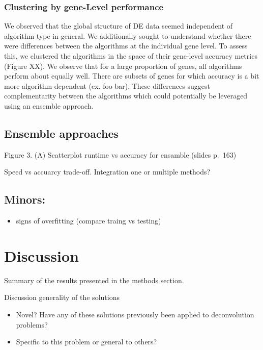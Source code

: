 \documentclass[]{article}
\providecommand{\tightlist}{%
  \setlength{\itemsep}{0pt}\setlength{\parskip}{0pt}}
\begin{document}
\hypertarget{clustering-by-gene-level-performance}{%
\subsubsection{Clustering by gene-Level
performance}\label{clustering-by-gene-level-performance}}

We observed that the global structure of DE data seemed independent of
algorithm type in general. We additionally sought to understand whether
there were differences between the algorithms at the individual gene
level. To assess this, we clustered the algorithms in the space of their
gene-level accuracy metrics (Figure XX). We observe that for a large
proportion of genes, all algorithms perform about equally well. There
are subsets of genes for which accuracy is a bit more
algorithm-dependent \color{red}(ex. foo bar).\color{black} These
differences suggest complementarity between the algorithms which could
potentially be leveraged using an ensemble approach.

\hypertarget{ensemble-approaches}{%
\subsection{Ensemble approaches}\label{ensemble-approaches}}

Figure 3. (A) Scatterplot runtime vs accuracy for ensamble (slides
p.~163)

Speed vs accuarcy trade-off. Integration one or multiple methods?

\hypertarget{minors}{%
\subsection{Minors:}\label{minors}}

\begin{itemize}
\tightlist
\item
  signs of overfitting (compare traing vs testing)
\end{itemize}

\hypertarget{discussion}{%
\section{Discussion}\label{discussion}}

Summary of the results presented in the methods section.

Discussion generality of the solutions

\begin{itemize}
\tightlist
\item
  Novel? Have any of these solutions previously been applied to
  deconvolution problems?
\item
  Specific to this problem or general to others?
\end{itemize}
\end{document}
